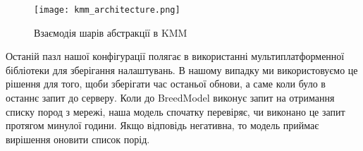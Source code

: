 \begin{figure}
    \begin{center}
        \texttt{[image: kmm\_architecture.png]}
        \caption{Взаємодія шарів абстракції в KMM}
        \label{fig:kmm_architecture}
    \end{center}
\end{figure}

Останій пазл нашої конфігурації полягає в використанні мультиплатформенної бібліотеки для зберігання налаштувань.
В нашому випадку ми використовуємо це рішення для того, щоби зберігати час останьої обнови, а саме коли було в останнє запит до серверу.
Коли до BreedModel виконує запит на отримання списку пород з мережі, наша модель спочатку перевіряє, чи виконано це запит протягом минулої години.
Якщо відповідь негативна, то модель приймає вирішення оновити список порід.

